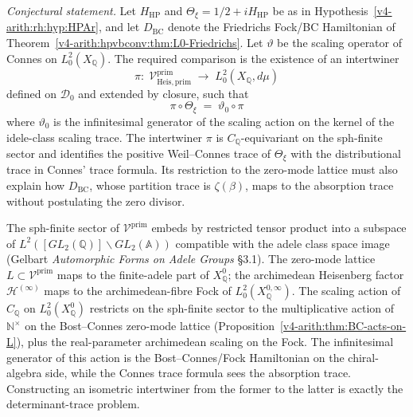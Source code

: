 \begin{conjecture}
\label{v4-arith:hpvbconv:thm:connes-identification}
\emph{Conjectural statement.} Let \(H_{\mathrm{HP}}\) and
\(\Theta_{\xi}=1/2+iH_{\mathrm{HP}}\) be as in
Hypothesis~\ref{v4-arith:rh:hyp:HPAr}, and let \(D_{\mathrm{BC}}\) denote the
Friedrichs Fock/BC Hamiltonian of
Theorem~\ref{v4-arith:hpvbconv:thm:L0-Friedrichs}. Let
\(\vartheta\) be the scaling operator of Connes on
\(L^{2}_{0}(X_{\mathbb{Q}})\). The required comparison is the existence
of an intertwiner
\begin{equation}
\label{v4-arith:hpvbconv:eq:intertwiner}
\pi:\;\mathcal{V}^{\mathrm{prim}}_{\mathrm{Heis},\mathrm{prim}}\;\longrightarrow\;L^{2}_{0}(X_{\mathbb{Q}},d\mu)
\end{equation}
defined on \(\mathcal{D}_{0}\) and extended by closure, such that
\begin{equation}
\label{v4-arith:hpvbconv:eq:intertwining}
\pi\circ \Theta_{\xi}\;=\;\vartheta_{0}\circ\pi
\end{equation}
where \(\vartheta_{0}\) is the infinitesimal generator of the scaling
action on the kernel of the idele-class scaling trace. The intertwiner
\(\pi\) is \(C_{\mathbb{Q}}\)-equivariant on the sph-finite sector and
identifies the positive Weil--Connes trace of \(\Theta_{\xi}\) with
the distributional trace in Connes' trace formula. Its restriction to
the zero-mode lattice must also explain how \(D_{\mathrm{BC}}\), whose
partition trace is \(\zeta(\beta)\), maps to the absorption trace
without postulating the zero divisor.
\end{conjecture}

\begin{remark}
The sph-finite sector of \(\mathcal{V}^{\mathrm{prim}}\) embeds by
restricted tensor product into a subspace of \(L^{2}([GL_{2}(\mathbb{Q})]\backslash
GL_{2}(\mathbb{A}))\) compatible with the adele class space image
(Gelbart \emph{Automorphic Forms on Adele Groups} \S3.1). The
zero-mode lattice \(L\subset\mathcal{V}^{\mathrm{prim}}\) maps to the
finite-adele part of \(X_{\mathbb{Q}}^{0}\); the archimedean
Heisenberg factor \(\mathcal{H}^{(\infty)}\) maps to the
archimedean-fibre Fock of \(L^{2}_{0}(X_{\mathbb{Q}}^{0,\infty})\). The
scaling action of \(C_{\mathbb{Q}}\) on \(L^{2}_{0}(X_{\mathbb{Q}}^{0})\)
restricts on the sph-finite sector to the multiplicative action of
\(\mathbb{N}^{\times}\) on the Bost--Connes zero-mode lattice
(Proposition~\ref{v4-arith:thm:BC-acts-on-L}), plus the real-parameter
archimedean scaling on the Fock. The infinitesimal generator of
this action is the Bost--Connes/Fock Hamiltonian on the
chiral-algebra side, while the Connes trace formula sees the
absorption trace. Constructing an isometric intertwiner from the
former to the latter is exactly the determinant-trace problem.
\end{remark}

